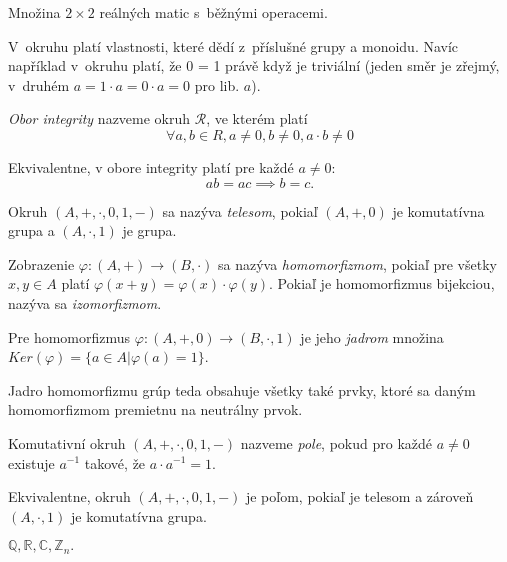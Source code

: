\begin{example}
    Množina $2 \times 2$ reálných matic s~běžnými operacemi.
\end{example}

V~okruhu platí vlastnosti, které dědí z~příslušné grupy a monoidu.
Navíc například v~okruhu platí, že 0 = 1 právě když je triviální (jeden
směr je zřejmý, v~druhém $a = 1 \cdot a = 0 \cdot a = 0$ pro lib. $a$).

\begin{definition}
    {\em Obor integrity} nazveme okruh $\mathcal{R}$, ve kterém platí
    \[
        \forall a,b \in R, a \neq 0, b \neq 0, a \cdot b \neq 0
    \]
\end{definition}

Ekvivalentne, v obore integrity platí pre každé $a \neq 0$:
\[
	ab = ac \implies b = c.
\]

\begin{definition}[Teleso]
    Okruh $(A, +, \cdot, 0, 1, -)$ sa nazýva {\em telesom}, pokiaľ
	$(A, +, 0)$ je komutatívna grupa a $(A, \cdot, 1)$ je grupa.
\end{definition}

\begin{definition}
    Zobrazenie $\varphi: (A,+) \to (B,\cdot)$ sa nazýva {\em homomorfizmom},
	pokiaľ pre všetky $x,y \in A$ platí $\varphi(x+y)=\varphi(x) \cdot \varphi(y)$.
	Pokiaľ je homomorfizmus bijekciou, nazýva sa {\em izomorfizmom}.
\end{definition}

\begin{definition}
    Pre homomorfizmus $\varphi: (A,+,0) \to (B,\cdot,1)$ je jeho {\em jadrom}
	množina $Ker(\varphi)=\{ a \in A  | \varphi(a) = 1\}$.
\end{definition}

Jadro homomorfizmu grúp teda obsahuje všetky také prvky, ktoré sa daným
homomorfizmom premietnu na neutrálny prvok.

\begin{definition}[Pole]
Komutativní okruh $(A, +, \cdot, 0, 1, -)$ nazveme {\em pole}, pokud
pro každé $a \neq 0$ existuje $a^{-1}$ takové, že $a \cdot a^{-1} = 1$.
\end{definition}

Ekvivalentne, okruh $(A, +, \cdot, 0, 1, -)$ je poľom, pokiaľ je telesom
a zároveň $(A, \cdot, 1)$ je komutatívna grupa.

\begin{example}
    $\mathbb{Q}, \mathbb{R}, \mathbb{C}, \mathbb{Z}_n.$
\end{example}

